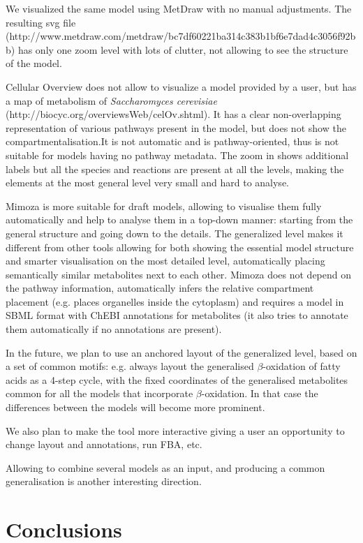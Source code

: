\documentclass{bmcart}
\begin{document}
We visualized the same model using MetDraw with no manual adjustments. The resulting svg file (http://www.metdraw.com/metdraw/bc7df60221ba314c383b1bf6e7dad4c3056f92bb) has only one zoom level with lots of clutter, not allowing to see the structure of the model.

Cellular Overview does not allow to visualize a model provided by a user, but has a map of metabolism of \emph{Saccharomyces cerevisiae} (http://biocyc.org/overviewsWeb/celOv.shtml). It has a clear non-overlapping representation of various pathways present in the model, but does not show the compartmentalisation.It is not automatic and is pathway-oriented, thus is not suitable for models having no pathway metadata. The zoom in shows additional labels but all the species and reactions are present at all the levels, making the elements at the most general level very small and hard to analyse.

Mimoza is more suitable for draft models, allowing to visualise them fully automatically and help to analyse them  in a top-down manner: starting from the general structure and going down to the details. The generalized level makes it different from other tools allowing for both showing the essential model structure and smarter visualisation on the most detailed level, automatically placing semantically similar metabolites next to each other. Mimoza does not depend on the pathway information, automatically infers the relative compartment placement (e.g. places organelles inside the cytoplasm) and requires a model in SBML format with ChEBI annotations for metabolites (it also tries to annotate them automatically if no annotations are present).

In the future, we plan to use an anchored layout of the generalized level, based on a set of common motifs: e.g. always layout the generalised $\beta$-oxidation of fatty acids as a 4-step cycle, with the fixed coordinates of the generalised metabolites common for all the models that incorporate $\beta$-oxidation. In that case the differences between the models will become more prominent.
 
We also plan to make the tool more interactive giving a user an opportunity to change layout and annotations, run FBA, etc. 

Allowing to combine several models as an input, and producing a common generalisation is another interesting direction.

\section*{Conclusions}
\end{document}
